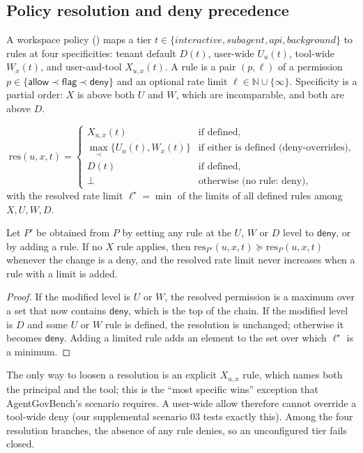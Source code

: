 \subsection{Policy resolution and deny precedence}
A workspace policy () maps a tier $t\in\{\mathit{interactive},\mathit{subagent},\mathit{api},\mathit{background}\}$ to rules at four specificities: tenant default $D(t)$, user-wide $U_u(t)$, tool-wide $W_x(t)$, and user-and-tool $X_{u,x}(t)$. A rule is a pair $(p,\ell)$ of a permission $p\in\{\mathsf{allow}\prec\mathsf{flag}\prec\mathsf{deny}\}$ and an optional rate limit $\ell\in\mathbb{N}\cup\{\infty\}$. Specificity is a partial order: $X$ is above both $U$ and $W$, which are incomparable, and both are above $D$.

\begin{definition}[Resolution]
\[
\mathrm{res}(u,x,t)=
\begin{cases}
X_{u,x}(t) & \text{if defined,}\\
\max_{\prec}\{U_u(t),W_x(t)\} & \text{if either is defined (deny-overrides),}\\
D(t) & \text{if defined,}\\
\bot & \text{otherwise (no rule: deny),}
\end{cases}
\]
with the resolved rate limit $\ell^\star=\min$ of the limits of all defined rules among $X,U,W,D$.
\end{definition}

\begin{theorem}
\label{thm:deny}
Let $P'$ be obtained from $P$ by setting any rule at the $U$, $W$ or $D$ level to $\mathsf{deny}$, or by adding a rule. If no $X$ rule applies, then $\mathrm{res}_{P'}(u,x,t)\succeq\mathrm{res}_P(u,x,t)$ whenever the change is a deny, and the resolved rate limit never increases when a rule with a limit is added.
\end{theorem}
\begin{proof}
If the modified level is $U$ or $W$, the resolved permission is a maximum over a set that now contains $\mathsf{deny}$, which is the top of the chain. If the modified level is $D$ and some $U$ or $W$ rule is defined, the resolution is unchanged; otherwise it becomes $\mathsf{deny}$. Adding a limited rule adds an element to the set over which $\ell^\star$ is a minimum.
\end{proof}
The only way to loosen a resolution is an explicit $X_{u,x}$ rule, which names both the principal and the tool; this is the ``most specific wins'' exception that AgentGovBench's scenario  requires. A user-wide allow therefore cannot override a tool-wide deny (our supplemental scenario 03 tests exactly this). Among the four resolution branches, the absence of any rule denies, so an unconfigured tier fails closed.

